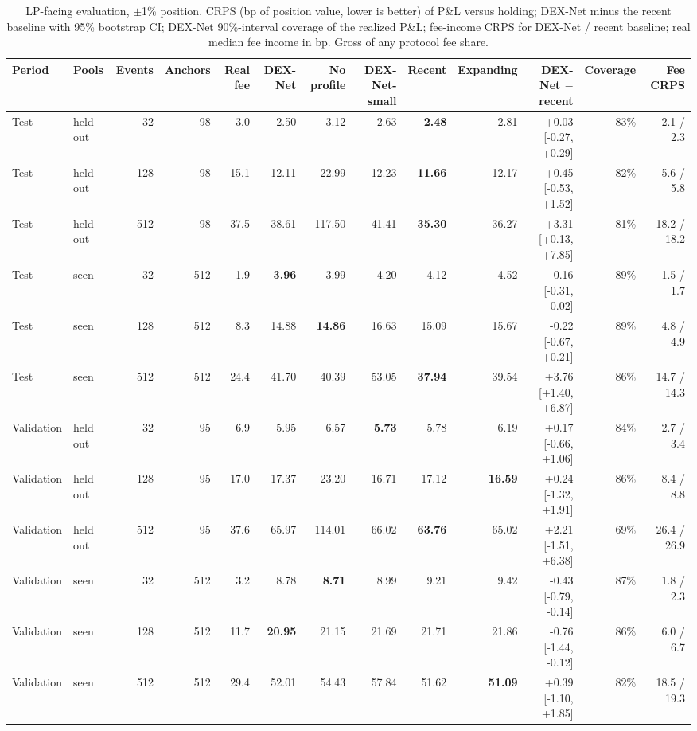 \documentclass[11pt]{article}
\begin{document}
\begin{table}[t]
\centering
\caption{LP-facing evaluation, \ensuremath{\pm}1\% position. CRPS (bp of position value, lower is better) of P\&L versus holding; DEX-Net minus the recent baseline with 95\% bootstrap CI; DEX-Net 90\%-interval coverage of the realized P\&L; fee-income CRPS for DEX-Net / recent baseline; real median fee income in bp. Gross of any protocol fee share.}\label{tab:7}
\begin{adjustbox}{max width=\linewidth}
\begin{tabular}{llrrrrrrrrrrr}
\toprule
Period & Pools & Events & Anchors & Real fee & DEX-Net & No profile & DEX-Net-small & Recent & Expanding & DEX-Net \ensuremath{-} recent & Coverage & Fee CRPS \\
\midrule
Test & held out & 32 & 98 & 3.0 & 2.50 & 3.12 & 2.63 & \textbf{2.48} & 2.81 & +0.03 [-0.27, +0.29] & 83\% & 2.1 / 2.3 \\
Test & held out & 128 & 98 & 15.1 & 12.11 & 22.99 & 12.23 & \textbf{11.66} & 12.17 & +0.45 [-0.53, +1.52] & 82\% & 5.6 / 5.8 \\
Test & held out & 512 & 98 & 37.5 & 38.61 & 117.50 & 41.41 & \textbf{35.30} & 36.27 & +3.31 [+0.13, +7.85] & 81\% & 18.2 / 18.2 \\
\midrule
Test & seen & 32 & 512 & 1.9 & \textbf{3.96} & 3.99 & 4.20 & 4.12 & 4.52 & -0.16 [-0.31, -0.02] & 89\% & 1.5 / 1.7 \\
Test & seen & 128 & 512 & 8.3 & 14.88 & \textbf{14.86} & 16.63 & 15.09 & 15.67 & -0.22 [-0.67, +0.21] & 89\% & 4.8 / 4.9 \\
Test & seen & 512 & 512 & 24.4 & 41.70 & 40.39 & 53.05 & \textbf{37.94} & 39.54 & +3.76 [+1.40, +6.87] & 86\% & 14.7 / 14.3 \\
\midrule
Validation & held out & 32 & 95 & 6.9 & 5.95 & 6.57 & \textbf{5.73} & 5.78 & 6.19 & +0.17 [-0.66, +1.06] & 84\% & 2.7 / 3.4 \\
Validation & held out & 128 & 95 & 17.0 & 17.37 & 23.20 & 16.71 & 17.12 & \textbf{16.59} & +0.24 [-1.32, +1.91] & 86\% & 8.4 / 8.8 \\
Validation & held out & 512 & 95 & 37.6 & 65.97 & 114.01 & 66.02 & \textbf{63.76} & 65.02 & +2.21 [-1.51, +6.38] & 69\% & 26.4 / 26.9 \\
\midrule
Validation & seen & 32 & 512 & 3.2 & 8.78 & \textbf{8.71} & 8.99 & 9.21 & 9.42 & -0.43 [-0.79, -0.14] & 87\% & 1.8 / 2.3 \\
Validation & seen & 128 & 512 & 11.7 & \textbf{20.95} & 21.15 & 21.69 & 21.71 & 21.86 & -0.76 [-1.44, -0.12] & 86\% & 6.0 / 6.7 \\
Validation & seen & 512 & 512 & 29.4 & 52.01 & 54.43 & 57.84 & 51.62 & \textbf{51.09} & +0.39 [-1.10, +1.85] & 82\% & 18.5 / 19.3 \\
\bottomrule
\end{tabular}
\end{adjustbox}
\end{table}
\end{document}
